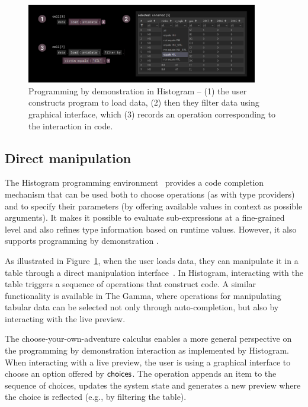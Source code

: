 \documentclass[a4paper,UKenglish,cleveref, autoref, thm-restate]{lipics-v2021}
\newcommand{\ident}[1]{\textsf{#1}}
\newcommand{\choices}{\textnormal{\ident{choices}}}
\begin{document}
\begin{figure}[t]
  \includegraphics[width=0.9\textwidth]{fig/histogram.png}
  \caption{Programming by demonstration in Histogram -- (1) the user constructs program to load
    data, (2) then they filter data using graphical interface, which (3) records an operation
    corresponding to the interaction in code.}
  \label{fig:histogram}
\end{figure}

\subsection{Direct manipulation}

The Histogram programming environment~\cite{petricek-2019-histogram} provides a code completion
mechanism that can be used both to choose operations (as with type providers) and to specify
their parameters (by offering available values in context as possible arguments). It makes it
possible to evaluate sub-expressions at a fine-grained level and also refines type information
based on runtime values. However, it also supports programming by demonstration
\cite{cypher-1993-pbd,kandel-2011-wrangler}.

As illustrated in Figure~\ref{fig:histogram}, when the user loads data, they can manipulate it
in a table through a direct manipulation interface~\cite{shneiderman-1983-direct}. In Histogram,
interacting with the table triggers a sequence of operations that construct code. A similar
functionality is available in The Gamma, where operations for manipulating tabular data can be
selected not only through auto-completion, but also by interacting with the live preview.

The choose-your-own-adventure calculus enables a more general perspective on the programming
by demonstration interaction as implemented by Histogram. When interacting with a live
preview, the user is using a graphical interface to choose an option offered by $\choices$.
The operation appends an item to the sequence of choices, updates the system state
and generates a new preview where the choice is reflected (e.g., by filtering the table).
\end{document}
